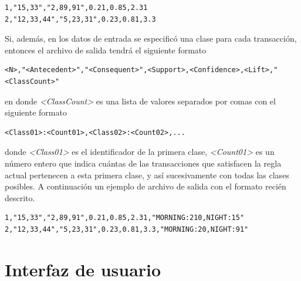 \begin{lstlisting}[basicstyle=\ttfamily]
1,"15,33","2,89,91",0.21,0.85,2.31
2,"12,33,44","5,23,31",0.23,0.81,3.3
\end{lstlisting}

Si, además, en los datos de entrada se especificó una clase para cada transacción, entonces el archivo de salida tendrá el siguiente formato

\begin{lstlisting}[basicstyle=\ttfamily]
<N>,"<Antecedent>","<Consequent>",<Support>,<Confidence>,<Lift>,"<ClassCount>"
\end{lstlisting}

en donde \textit{<ClassCount>} es una lista de valores separados por comas con el siguiente formato

\begin{lstlisting}[basicstyle=\ttfamily]
<Class01>:<Count01>,<Class02>:<Count02>,...
\end{lstlisting}

donde \textit{<Class01>} es el identificador de la primera clase, \textit{<Count01>} es un número entero que indica cuántas de las transacciones que satisfacen la regla actual pertenecen a esta primera clase, y así sucesivamente con todas las clases posibles. A continuación un ejemplo de archivo de salida con el formato recién descrito.

\begin{lstlisting}[basicstyle=\ttfamily]
1,"15,33","2,89,91",0.21,0.85,2.31,"MORNING:210,NIGHT:15"
2,"12,33,44","5,23,31",0.23,0.81,3.3,"MORNING:20,NIGHT:91"
\end{lstlisting}


\section{Interfaz de usuario}



